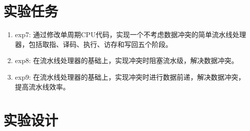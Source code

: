 \documentclass[UTF8]{report}
\begin{document}
\pagestyle{fancy}

\maketitle

\section{实验任务}

\begin{enumerate}
    \item exp7: 通过修改单周期CPU代码，实现一个不考虑数据冲突的简单流水线处理器，包括取指、译码、执行、访存和写回五个阶段。
    \item exp8: 在流水线处理器的基础上，实现冲突时阻塞流水级，解决数据冲突。
    \item exp9: 在流水线处理器的基础上，实现冲突时进行数据前递，解决数据冲突，提高流水线效率。
\end{enumerate}

\section{实验设计}
\end{document}
